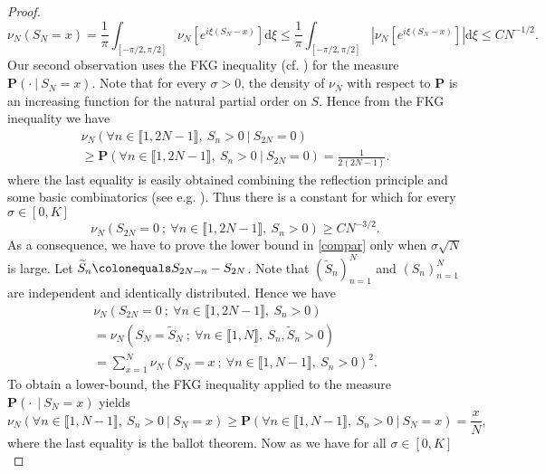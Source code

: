 \documentclass[reqno,11pt]{amsart}
\numberwithin{equation}{section}
\newcommand{\bP}{{\ensuremath{\mathbf P}} }
\newcommand{\lint}{\llbracket}
\newcommand{\rint}{\rrbracket}
\newcommand{\dd}{\mathrm{d}}
\renewcommand{\tilde}{\widetilde}
\begin{document}
\begin{proof}
\begin{equation}
   \nu_N(S_{N}=x)=  \frac{1}{\pi}  \int_{[-\pi/2,\pi/2]} \nu_N[e^{i\xi(S_{N}-x)}] \dd \xi\le  \frac{1}{\pi} \int_{[-\pi/2,\pi/2]} | \nu_N[e^{i\xi(S_{N}-x)}]| \dd \xi \le C N^{-1/2}.
\end{equation}
Our second observation uses the FKG inequality (cf.  \cite[Lemma 3.3]{lacoin2016mixing}) for the measure  $\bP\left( \cdot \ | \  S_N=x  \right)$. Note that for every $\sigma>0$, the density of $\nu_N$ with respect to $\bP$ is an increasing function for the natural partial order on $S$. Hence from the FKG inequality we have 
\begin{multline}
  \nu_{N}\left(  \forall n\in \lint 1,2N-1\rint, \ S_{n}>0 \ | \ S_{2N}=0  \right)\\
  \ge   \bP\left(  \forall n\in \lint 1,2N-1\rint, \ S_{n}>0 \ | \ S_{2N}=0 \right)=\frac{1}{2(2N-1)}.
 \end{multline}
  where the last equality is easily obtained combining the reflection principle and some basic combinatorics (see e.g.  \cite[Theorem 4.3.1]{Durrett}).
 Thus there is a constant for which for every $\sigma \in [0, K]$
 \begin{equation}
 \nu_{N}\left( S_{2N}=0 \ ; \ \forall n\in \lint 1,2N-1\rint, \ S_{n}>0  \right)\ge CN^{-3/2}.
 \end{equation}
As a consequence, we have to prove the lower bound in \eqref{compar} only when $\sigma \sqrt{N}$ is large.
Let $\tilde S_n \colonequals S_{2N-n}-S_{2N}$. Note that $(\tilde S_n)_{n=1}^N$ and $(S_n)_{n=1}^N$ are independent and identically distributed. Hence we have
 \begin{multline}\label{decompox}
  \nu_{N}\left( S_{2N}=0 \ ; \ \forall n\in \lint 1,2N-1\rint, \ S_{n}>0  \right)\\=
  \nu_{N}\left( S_N=\tilde S_N \ ; \  \forall n\in \lint 1,N\rint, \ S_{n}, \tilde S_n >0 \right)\\
  =\sum_{x=1}^N   \nu_{N}\left( S_N=x \ ; \  \forall n\in \lint 1,N-1\rint, \ S_{n} >0 \right)^2.
 \end{multline}
To obtain a lower-bound,  the FKG inequality applied to the measure  $\bP\left( \cdot \  \ | \  S_N=x  \right)$ yields  
\begin{equation}
 \nu_{N}\left(   \forall n\in \lint 1,N-1\rint, \ S_{n} >0  \ | \  S_N=x  \right)\ge  \bP\left(   \forall n\in \lint 1,N-1\rint, \ S_{n} >0  \ | \  S_N=x  \right)= \frac{x}{N},
 \end{equation}
 where the last equality is the ballot theorem.
Now as we have for all $\sigma\in [0,K]$
\begin{equation}\label{espevar}

\end{equation}
\end{proof}
\end{document}
